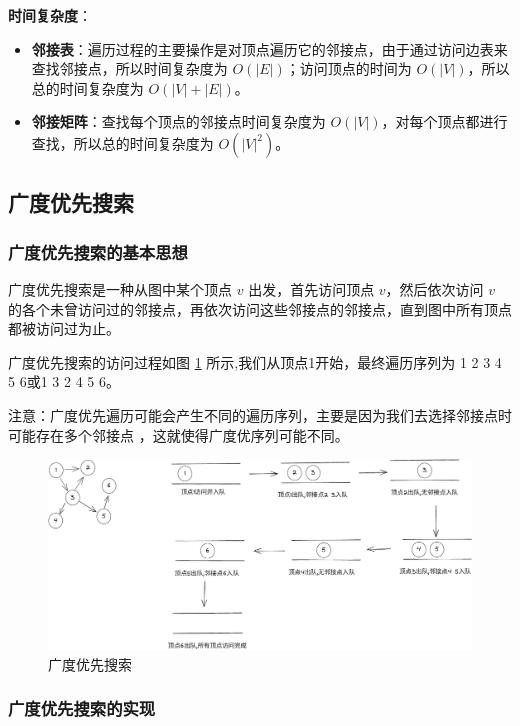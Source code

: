 \documentclass[lang=cn,newtx,10pt,scheme=chinese]{../elegantbook}
\begin{document}
\textbf{时间复杂度}：
\begin{itemize}
  \item \textbf{邻接表}：遍历过程的主要操作是对顶点遍历它的邻接点，由于通过访问边表来查找邻接点，所以时间复杂度为 $O(|E|)$；访问顶点的时间为 $O(|V|)$，所以总的时间复杂度为 $O(|V| + |E|)$。
  \item \textbf{邻接矩阵}：查找每个顶点的邻接点时间复杂度为 $O(|V|)$，对每个顶点都进行查找，所以总的时间复杂度为 $O(|V|^2)$。
\end{itemize}


\subsection{广度优先搜索}

\subsubsection{广度优先搜索的基本思想}

广度优先搜索是一种从图中某个顶点 $v$ 出发，首先访问顶点 $v$，然后依次访问 $v$ 的各个未曾访问过的邻接点，再依次访问这些邻接点的邻接点，直到图中所有顶点都被访问过为止。

广度优先搜索的访问过程如图 \ref{fig:breadthFirst} 所示,我们从顶点1开始，最终遍历序列为 1 2 3 4 5 6或1 3 2 4 5 6。

注意：广度优先遍历可能会产生不同的遍历序列，主要是因为我们去选择邻接点时可能存在多个邻接点 ，这就使得广度优序列可能不同。

\begin{figure}[h!]
  \centering
  \includegraphics[width=1\textwidth]{./figure/pdf/cropped/breadthFirst.pdf}
  \caption{广度优先搜索}
  \label{fig:breadthFirst}
\end{figure}


\subsubsection{广度优先搜索的实现}
\end{document}
